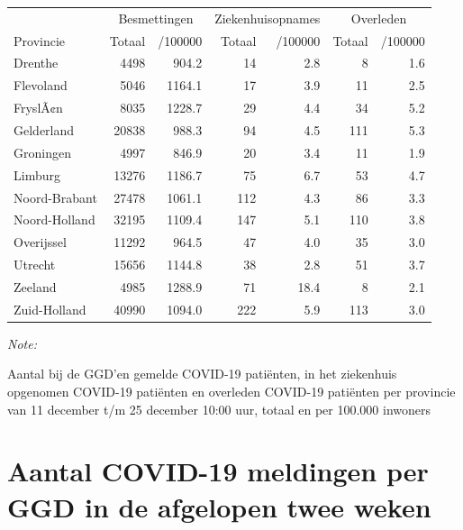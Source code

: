 \documentclass[
  english,
  man,floatsintext]{apa6}
\begin{document}
\begin{table}
\centering
\begin{threeparttable}
\begin{tabular}{lrrrrrr}
\toprule
\multicolumn{1}{c}{ } & \multicolumn{2}{c}{Besmettingen} & \multicolumn{2}{c}{Ziekenhuisopnames} & \multicolumn{2}{c}{Overleden} \\
\cmidrule(l{3pt}r{3pt}){2-3} \cmidrule(l{3pt}r{3pt}){4-5} \cmidrule(l{3pt}r{3pt}){6-7}
Provincie & Totaal & /100000 & Totaal & /100000 & Totaal & /100000\\
\midrule
Drenthe & 4498 & 904.2 & 14 & 2.8 & 8 & 1.6\\
Flevoland & 5046 & 1164.1 & 17 & 3.9 & 11 & 2.5\\
FryslÃ¢n & 8035 & 1228.7 & 29 & 4.4 & 34 & 5.2\\
Gelderland & 20838 & 988.3 & 94 & 4.5 & 111 & 5.3\\
Groningen & 4997 & 846.9 & 20 & 3.4 & 11 & 1.9\\
Limburg & 13276 & 1186.7 & 75 & 6.7 & 53 & 4.7\\
Noord-Brabant & 27478 & 1061.1 & 112 & 4.3 & 86 & 3.3\\
Noord-Holland & 32195 & 1109.4 & 147 & 5.1 & 110 & 3.8\\
Overijssel & 11292 & 964.5 & 47 & 4.0 & 35 & 3.0\\
Utrecht & 15656 & 1144.8 & 38 & 2.8 & 51 & 3.7\\
Zeeland & 4985 & 1288.9 & 71 & 18.4 & 8 & 2.1\\
Zuid-Holland & 40990 & 1094.0 & 222 & 5.9 & 113 & 3.0\\
\bottomrule
\end{tabular}
\begin{tablenotes}
\item \textit{Note: } 
\item Aantal bij de GGD’en gemelde COVID-19 patiënten, in het ziekenhuis opgenomen COVID-19 patiënten en overleden COVID-19 patiënten per provincie van 11 december t/m 25 december 10:00 uur, totaal en per 100.000 inwoners
\end{tablenotes}
\end{threeparttable}
\end{table}

\newpage

\hypertarget{aantal-covid-19-meldingen-per-ggd-in-de-afgelopen-twee-weken}{%
\section{Aantal COVID-19 meldingen per GGD in de afgelopen twee weken}\label{aantal-covid-19-meldingen-per-ggd-in-de-afgelopen-twee-weken}}
\end{document}
